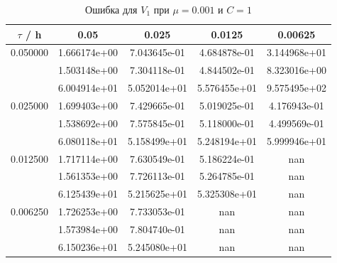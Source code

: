 \documentclass[specialist,subf,href,colorlinks=true,12pt
,times,mtpro,specialist
]{disser}
\begin{document}
\begin{table}[H]
\small
\caption{Ошибка для $V_1$ при $\mu=0.001$ и $C = 1$}
\begin{center}
\begin{tabular}{|c|c|c|c|c|}
\hline
$\tau$ / h & 0.05 & 0.025 & 0.0125 & 0.00625 \\
\hline
0.050000 & 1.666174e+00  & 7.043645e-01  & 4.684878e-01  & 3.144968e+01 \\
 & 1.503148e+00  & 7.304118e-01  & 4.844502e-01  & 8.323016e+00 \\
 & 6.004914e+01  & 5.052014e+01  & 5.576455e+01  & 9.575495e+02 \\
\hline
0.025000 & 1.699403e+00  & 7.429665e-01  & 5.019025e-01  & 4.176943e-01 \\
 & 1.538692e+00  & 7.575845e-01  & 5.118000e-01  & 4.499569e-01 \\
 & 6.080118e+01  & 5.158499e+01  & 5.248194e+01  & 5.999946e+01 \\
\hline
0.012500 & 1.717114e+00  & 7.630549e-01  & 5.186224e-01  & nan \\
 & 1.561353e+00  & 7.726113e-01  & 5.264785e-01  & nan \\
 & 6.125439e+01  & 5.215625e+01  & 5.325308e+01  & nan \\
\hline
0.006250 & 1.726253e+00  & 7.733053e-01  & nan  & nan \\
 & 1.573984e+00  & 7.804740e-01  & nan  & nan \\
 & 6.150236e+01  & 5.245080e+01  & nan  & nan \\
\hline
\end{tabular}
\end{center}
\end{table}
\end{document}

